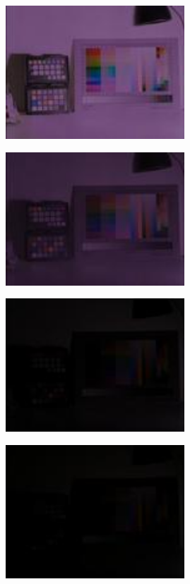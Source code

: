 \begin{center}
\includegraphics[height=5cm]{images/100ms-1ms-40-tiny}
\end{center}

\begin{center}
\includegraphics[height=5cm]{images/100ms-1ms-48-tiny}
\end{center}

\begin{center}
\includegraphics[height=5cm]{images/100ms-1ms-56-tiny}
\end{center}

\begin{center}
\includegraphics[height=5cm]{images/100ms-1ms-63-tiny}
\end{center}

